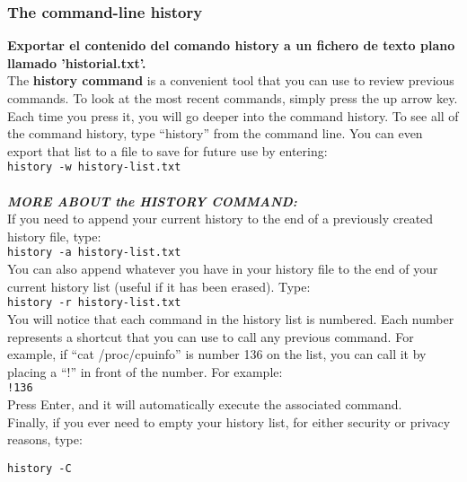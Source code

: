 \documentclass[a4paper,11pt,spanish]{article} %
\begin{document}
\subsubsection{The command-line history}

\textbf{Exportar el contenido del comando history a un fichero de texto plano llamado 'historial.txt'.}\\

The \textbf{history command} is a convenient tool that you can use to review previous commands. 
To look at the most recent commands, simply press the up arrow key. Each time you press it, 
you will go deeper into the command history. To see all of the command history, type “history” 
from the command line. You can even export that list to a file to save for future use by entering:\\

\texttt{history -w history-list.txt}\\ \\

\textbf{\emph{MORE ABOUT the HISTORY COMMAND:}}\\

If you need to append your current history to the end of a previously created history file, type:\\

\texttt{history -a history-list.txt}\\

You can also append whatever you have in your history file to the end of your current history list
(useful if it has been erased). Type:\\

\texttt{history -r history-list.txt}\\

You will notice that each command in the history list is numbered. Each number represents 
a shortcut that you can use to call any previous command. For example, if “cat /proc/cpuinfo” is 
number 136 on the list, you can call it by placing a “!” in front of the number. For example:\\

\texttt{!136}\\

Press Enter, and it will automatically execute the associated command.\\

Finally, if you ever need to empty your history list, for either security or privacy reasons, type:

\texttt{history -C}\\
\end{document}
